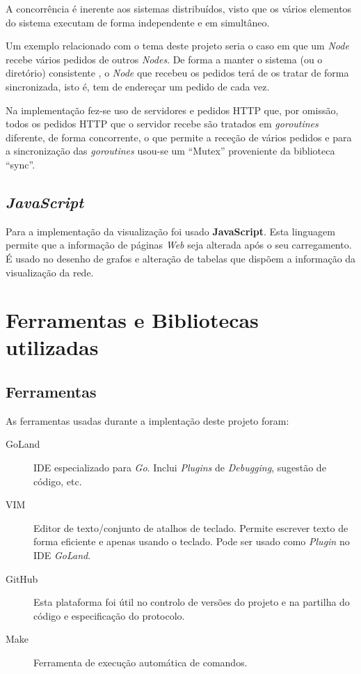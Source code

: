 A concorrência é inerente aos sistemas distribuídos, visto que os vários elementos do sistema executam de forma independente e em simultâneo.

Um exemplo relacionado com o tema deste projeto seria o caso em que um \emph{Node} recebe vários pedidos de outros \emph{Nodes}. De forma a manter o sistema (ou o diretório) consistente , o \emph{Node} que recebeu os pedidos terá de os tratar de forma sincronizada, isto é, tem de endereçar um pedido de cada vez.

Na implementação fez-se uso de servidores e pedidos \acs{HTTP} que, por omissão, todos os pedidos \acs{HTTP} que o servidor recebe são tratados em \emph{goroutines} diferente, de forma concorrente, o que permite a receção de vários pedidos e para a sincronização das \emph{goroutines} usou-se um ``Mutex'' proveniente da biblioteca ``sync''.


\subsection*{\emph{JavaScript}}
Para a implementação da visualização foi usado \textbf{JavaScript}.
Esta linguagem permite que a informação de páginas \emph{Web} seja alterada após o seu carregamento.
É usado no desenho de grafos e alteração de tabelas que dispõem a informação da visualização da rede.



\section{Ferramentas e Bibliotecas utilizadas}
\subsection*{Ferramentas}
As ferramentas usadas durante a implentação deste projeto foram:
\begin{description}
    \item [GoLand] \acs{IDE} especializado para \emph{Go}. Inclui \emph{Plugins} de \emph{Debugging}, sugestão de código, etc.
    \item [VIM] Editor de texto/conjunto de atalhos de teclado. Permite escrever texto de forma eficiente e apenas usando o teclado. Pode ser usado como \emph{Plugin} no \acs{IDE} \emph{GoLand}.
    \item [GitHub] Esta plataforma foi útil no controlo de versões do projeto e na partilha do código e especificação do protocolo.
    \item [Make] Ferramenta de execução automática de comandos.
\end{description}

